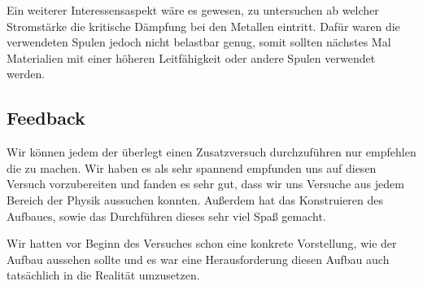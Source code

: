 Ein weiterer Interessensaspekt wäre es gewesen, zu untersuchen ab welcher Stromstärke
die kritische Dämpfung bei den Metallen eintritt. Dafür waren die verwendeten
Spulen jedoch nicht belastbar genug, somit sollten nächstes Mal Materialien mit
einer höheren Leitfähigkeit oder andere Spulen verwendet werden.

\subsection{Feedback}

Wir können jedem der überlegt einen Zusatzversuch durchzuführen nur empfehlen
die zu machen. Wir haben es als sehr spannend empfunden  uns auf
diesen Versuch vorzubereiten und fanden es sehr gut, dass
wir uns Versuche aus jedem Bereich der Physik aussuchen konnten.
Außerdem hat das Konstruieren des Aufbaues, sowie das Durchführen dieses
sehr viel Spaß gemacht.

Wir hatten vor Beginn des Versuches schon eine
konkrete Vorstellung, wie der Aufbau aussehen sollte und es war
eine Herausforderung diesen Aufbau auch tatsächlich in die
Realität umzusetzen.


